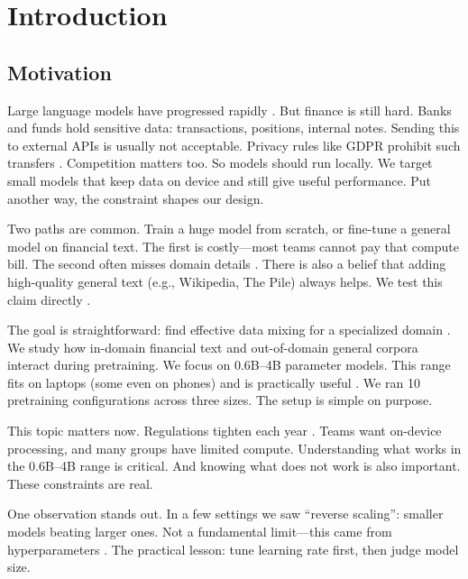 \chapter{Introduction}

\section{Motivation}

Large language models have progressed rapidly \parencite{vaswani2017attention,radford2019language,brown2020language,touvron2023llama}. But finance is still hard. Banks and funds hold sensitive data: transactions, positions, internal notes. Sending this to external APIs is usually not acceptable. Privacy rules like GDPR prohibit such transfers \parencite{eu2016gdpr}. Competition matters too. So models should run locally. We target small models that keep data on device and still give useful performance. Put another way, the constraint shapes our design.

Two paths are common. Train a huge model from scratch, or fine-tune a general model on financial text. The first is costly—most teams cannot pay that compute bill. The second often misses domain details \parencite{gururangan2020don}. There is also a belief that adding high-quality general text (e.g., Wikipedia, The Pile) always helps. We test this claim directly \parencite{gao2020pile,raffel2020exploring,longpre2023pretrainer}.

The goal is straightforward: find effective data mixing for a specialized domain \parencite{wu2023bloomberggpt}. We study how in-domain financial text and out-of-domain general corpora interact during pretraining. We focus on 0.6B–4B parameter models. This range fits on laptops (some even on phones) and is practically useful \parencite{yang2024qwen2,xia2023sheared,team2024gemma,javaheripi2023phi}. We ran 10 pretraining configurations across three sizes. The setup is simple on purpose.

This topic matters now. Regulations tighten each year \parencite{eu2016gdpr}. Teams want on-device processing, and many groups have limited compute. Understanding what works in the 0.6B--4B range is critical. And knowing what does not work is also important. These constraints are real.

One observation stands out. In a few settings we saw ``reverse scaling'': smaller models beating larger ones. Not a fundamental limit—this came from hyperparameters \parencite{kaplan2020scaling,hoffmann2022training,mccandlish2018empirical}. The practical lesson: tune learning rate first, then judge model size.

